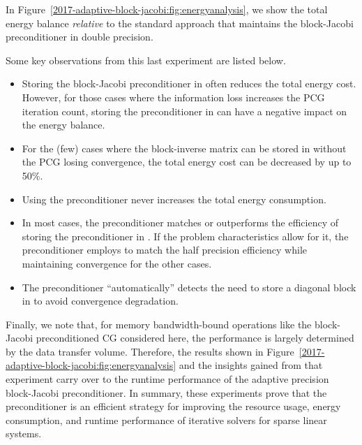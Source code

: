 In Figure~\ref{2017-adaptive-block-jacobi:fig:energyanalysis}, we show the total energy balance
\textit{relative} to the standard approach that maintains the block-Jacobi
preconditioner in double precision.

Some key observations from this last experiment are listed below.
\begin{itemize}
\item Storing the block-Jacobi preconditioner in \fps often reduces the
total energy cost. However, for those cases where the information loss increases
the PCG iteration count, storing the preconditioner in \fps can have a
negative impact on the energy balance.
\item For the (few) cases where the block-inverse matrix can be stored in
\fph without the PCG losing convergence, the total energy cost can be
decreased by up to 50\%.
\item Using the \apbj preconditioner never increases the total energy 
consumption. 
\item In most cases, the \apbj preconditioner matches or outperforms the
efficiency of storing the preconditioner in \fps. If the problem
characteristics allow for it, the \apbj preconditioner employs \fph to
match the half precision efficiency while maintaining convergence for the other
cases.
\item The \apbj preconditioner ``automatically'' detects the need to store a
diagonal block in \fpd to avoid convergence degradation.
\end{itemize}

Finally, we note that, for memory bandwidth-bound operations like the 
block-Jacobi
preconditioned CG considered here, the performance is largely determined by the
data transfer volume. Therefore, the results shown in 
Figure~\ref{2017-adaptive-block-jacobi:fig:energyanalysis}
and the insights gained from that experiment carry over to the runtime
performance of the adaptive precision block-Jacobi preconditioner. In summary,
these experiments prove that the \apbj preconditioner is an efficient strategy
for improving the resource usage, energy consumption, and runtime performance of
iterative solvers for sparse linear systems.

